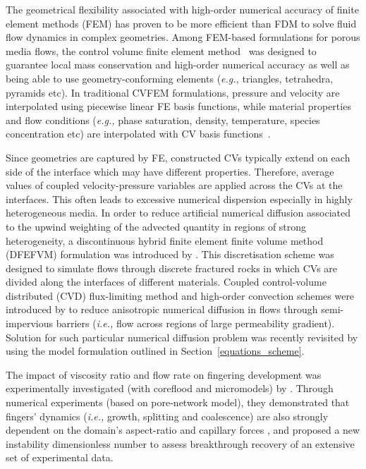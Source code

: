 \documentclass[preprint,authoryear,12pt]{elsarticle}
\newcommand{\eg}{{\it e.g., }}
\newcommand{\ie}{{\it i.e., }}
\begin{document}
The geometrical flexibility associated with high-order numerical accuracy of finite element methods (FEM) has proven to be more efficient than FDM to solve fluid flow dynamics in complex geometries. Among FEM-based formulations for porous media flows, the control volume finite element method~\citep[CVFEM,][]{fung_1992} was designed to guarantee local mass conservation and high-order numerical accuracy as well as being able to use geometry-conforming elements (\eg triangles, tetrahedra, pyramids etc). In traditional CVFEM formulations, pressure and velocity are interpolated using piecewise linear FE basis functions, while material properties and flow conditions (\eg phase saturation, density, temperature, species concentration etc) are interpolated with CV basis functions~\citep{voller_2009}. 

Since geometries are captured by FE, constructed CVs typically extend on each side of the interface which may have different properties. Therefore, average values of coupled velocity-pressure variables are applied across the CVs at the interfaces. This often leads to excessive numerical dispersion especially in highly heterogeneous media. In order to reduce artificial numerical diffusion associated to the upwind weighting of the advected quantity in regions of strong heterogeneity, a discontinuous hybrid finite element finite volume method (DFEFVM) formulation was introduced by \citet{nick_2011b, nick_2011a}. This discretisation scheme was designed to simulate flows through discrete fractured rocks in which CVs are divided along the interfaces of different materials. Coupled control-volume distributed (CVD) flux-limiting method and high-order convection schemes were introduced by \citet{edwards_2006} to reduce anisotropic numerical diffusion in flows through semi-impervious barriers (\ie flow across regions of large permeability gradient). Solution for such particular numerical diffusion problem was recently revisited by \citet{salinas_2018} using the model formulation outlined in Section~\ref{equations_scheme}. 

\medskip 
The impact of viscosity ratio and flow rate on fingering development was experimentally investigated (with coreflood and micromodels) by \citet{Doorwar_2016}. Through numerical experiments (based on pore-network model), they demonstrated that fingers' dynamics (\ie growth, splitting and coalescence) are also strongly dependent on the domain's aspect-ratio and capillary forces \citep[see][]{Doorwar_2014}, and proposed a new instability dimensionless number to assess breakthrough recovery of an extensive set of experimental data.  
\end{document}
